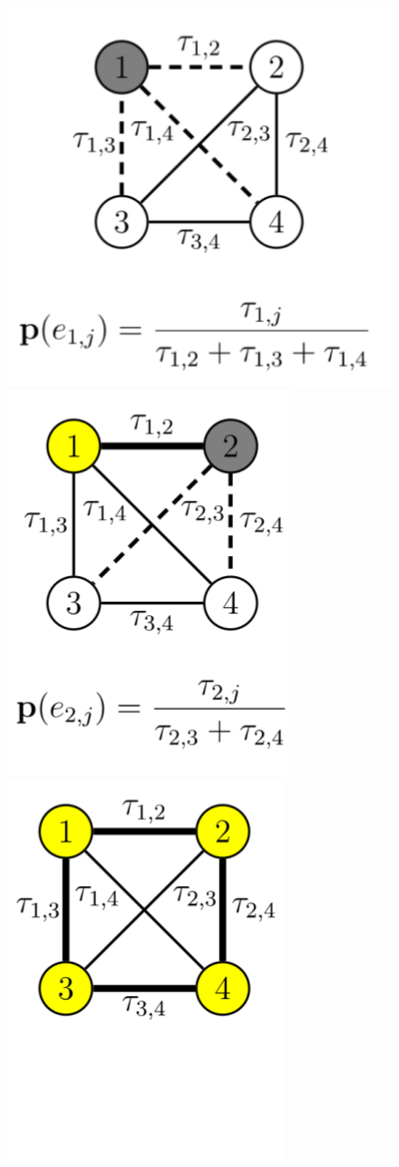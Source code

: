 \begin{figure}[ht]
  \includegraphics[width=0.32 \linewidth]{imgs/exemplo_aco_1}
  \includegraphics[width=0.32 \linewidth]{imgs/exemplo_aco_2}
  \includegraphics[width=0.32 \linewidth]{imgs/exemplo_aco_3}


\end{figure}
